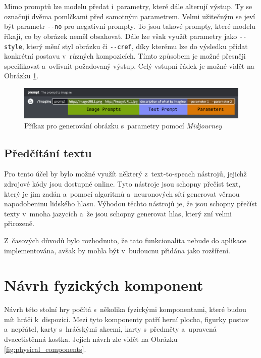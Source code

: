 Mimo promptů lze modelu předat i~parametry, které dále alterují výstup. Ty se označují dvěma pomlčkami před samotným parametrem. Velmi užitečným se jeví být parametr \texttt{{-}{-}no} pro negativní prompty. To jsou takové prompty, které modelu říkají, co by obrázek neměl obsahovat. Dále lze však využít parametry jako \texttt{{-}{-}style}, který mění styl obrázku či \texttt{{-}{-}cref}, díky kterému lze do výsledku přidat konkrétní postavu v~různých kompozicích. Tímto způsobem je možné přesněji specifikovat a~ovlivnit požadovaný výstup. Celý vstupní řádek je možné vidět na Obrázku \ref{fig:mj_prompts_params}.

\begin{figure}[H]
    \centering
    \includegraphics[width=1\textwidth]{resources/figures/midjourney_prompts_params.png}
    \caption{Příkaz pro generování obrázku s~parametry pomocí \textit{Midjourney} \cite{midjourney}}
    \label{fig:mj_prompts_params}
\end{figure}

\subsection{Předčítání textu}
Pro tento účel by bylo možné využít některý z~text-to-speach nástrojů, jejichž zdrojové kódy jsou dostupné online. Tyto nástroje jsou schopny přečíst text, který je jim zadán a~pomocí algoritmů a~neuronových sítí generovat věrnou napodobeninu lidského hlasu. Výhodou těchto nástrojů je, že jsou schopny přečíst texty v~mnoha jazycích a~že jsou schopny generovat hlas, který zní velmi přirozeně.

Z~časových důvodů bylo rozhodnuto, že tato funkcionalita nebude do aplikace implementována, avšak by mohla být v~budoucnu přidána jako rozšíření.

\section{Návrh fyzických komponent}
Návrh této stolní hry počítá s~několika fyzickými komponentami, které budou mít hráči k~dispozici. Mezi tyto komponenty patří herní plocha, figurky postav a~nepřátel, karty s~hráčskými akcemi, karty s~předměty a~upravená dvacetistěnná kostka. Jejich návrh zle vidět na Obrázku \ref{fig:physical_components}.


